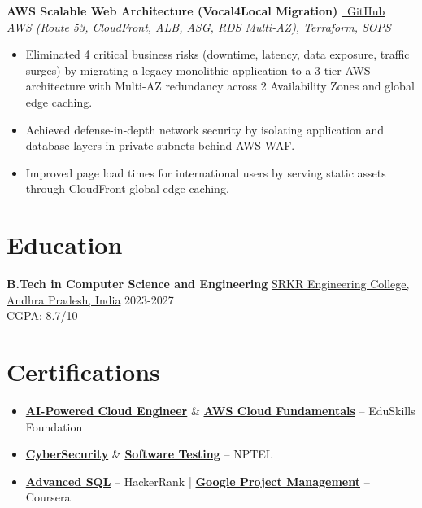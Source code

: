 \documentclass[10pt, letterpaper]{article}
\begin{document}
\noindent \textbf{AWS Scalable Web Architecture (Vocal4Local Migration)} \href{https://github.com/SoulByte07/AWS-Scalable-Web-Architecture}{\faGithub\ GitHub} \\
\textit{AWS (Route 53, CloudFront, ALB, ASG, RDS Multi-AZ), Terraform, SOPS}
\begin{itemize}
    \item Eliminated 4 critical business risks (downtime, latency, data exposure, traffic surges) by migrating a legacy monolithic application to a 3-tier AWS architecture with Multi-AZ redundancy across 2 Availability Zones and global edge caching.
    \item Achieved defense-in-depth network security by isolating application and database layers in private subnets behind AWS WAF.
    \item Improved page load times for international users by serving static assets through CloudFront global edge caching.
\end{itemize}



\section{Education}
\noindent \textbf{B.Tech in Computer Science and Engineering} \href{https://srkrec.edu.in/}{SRKR Engineering College, Andhra Pradesh, India} \hfill 2023-2027 \\
CGPA: 8.7/10

\section{Certifications}
\begin{itemize}
    \item \textbf{\href{https://certificate.eduskillsfoundation.org/verify/4d6c9ddc4847b75c885f/4d6c9ddc4847b75c885f}{AI-Powered Cloud Engineer}} \& \textbf{\href{https://aictecert.eduskillsfoundation.org/pages/home/verify.php?cert=506c51bebf5346e89556de98be1e44ce}{AWS Cloud Fundamentals}} -- EduSkills Foundation
    \item \textbf{\href{https://nptel.ac.in/noc/E_Certificate/NPTEL25CS120S65310101810650629}{CyberSecurity}} \& \textbf{\href{https://nptel.ac.in/noc/E_Certificate/NPTEL25CS113S25310089010650629}{Software Testing}} -- NPTEL
    \item \textbf{\href{https://www.hackerrank.com/certificates/e0bfd3d447c0}{Advanced SQL}} -- HackerRank | \textbf{\href{https://coursera.org/verify/6D9HTS2HRFHG}{Google Project Management}} -- Coursera
\end{itemize}
\end{document}

